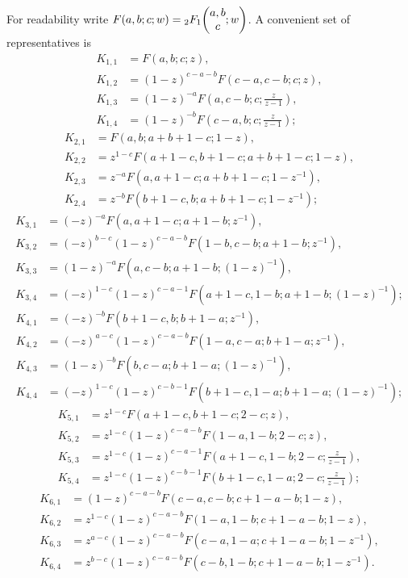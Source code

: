 For readability write \(F(a,b;c;w)={}_2F_1\!\left(\begin{matrix}a,b\\c\end{matrix};w\right)\).  A convenient set of
representatives is
\begin{align*}
K_{1,1}&=F(a,b;c;z),\\
K_{1,2}&=(1-z)^{c-a-b}F(c-a,c-b;c;z),\\
K_{1,3}&=(1-z)^{-a}F\left(a,c-b;c;\frac{z}{z-1}\right),\\
K_{1,4}&=(1-z)^{-b}F\left(c-a,b;c;\frac{z}{z-1}\right);
\end{align*}
\begin{align*}
K_{2,1}&=F(a,b;a+b+1-c;1-z),\\
K_{2,2}&=z^{1-c}F(a+1-c,b+1-c;a+b+1-c;1-z),\\
K_{2,3}&=z^{-a}F(a,a+1-c;a+b+1-c;1-z^{-1}),\\
K_{2,4}&=z^{-b}F(b+1-c,b;a+b+1-c;1-z^{-1});
\end{align*}
\begin{align*}
K_{3,1}&=(-z)^{-a}F(a,a+1-c;a+1-b;z^{-1}),\\
K_{3,2}&=(-z)^{b-c}(1-z)^{c-a-b}
 F(1-b,c-b;a+1-b;z^{-1}),\\
K_{3,3}&=(1-z)^{-a}F\left(a,c-b;a+1-b;(1-z)^{-1}\right),\\
K_{3,4}&=(-z)^{1-c}(1-z)^{c-a-1}
 F\left(a+1-c,1-b;a+1-b;(1-z)^{-1}\right);
\end{align*}
\begin{align*}
K_{4,1}&=(-z)^{-b}F(b+1-c,b;b+1-a;z^{-1}),\\
K_{4,2}&=(-z)^{a-c}(1-z)^{c-a-b}
 F(1-a,c-a;b+1-a;z^{-1}),\\
K_{4,3}&=(1-z)^{-b}F\left(b,c-a;b+1-a;(1-z)^{-1}\right),\\
K_{4,4}&=(-z)^{1-c}(1-z)^{c-b-1}
 F\left(b+1-c,1-a;b+1-a;(1-z)^{-1}\right);
\end{align*}
\begin{align*}
K_{5,1}&=z^{1-c}F(a+1-c,b+1-c;2-c;z),\\
K_{5,2}&=z^{1-c}(1-z)^{c-a-b}F(1-a,1-b;2-c;z),\\
K_{5,3}&=z^{1-c}(1-z)^{c-a-1}
 F\left(a+1-c,1-b;2-c;\frac{z}{z-1}\right),\\
K_{5,4}&=z^{1-c}(1-z)^{c-b-1}
 F\left(b+1-c,1-a;2-c;\frac{z}{z-1}\right);
\end{align*}
\begin{align*}
K_{6,1}&=(1-z)^{c-a-b}F(c-a,c-b;c+1-a-b;1-z),\\
K_{6,2}&=z^{1-c}(1-z)^{c-a-b}
 F(1-a,1-b;c+1-a-b;1-z),\\
K_{6,3}&=z^{a-c}(1-z)^{c-a-b}
 F(c-a,1-a;c+1-a-b;1-z^{-1}),\\
K_{6,4}&=z^{b-c}(1-z)^{c-a-b}
 F(c-b,1-b;c+1-a-b;1-z^{-1}).
\end{align*}

